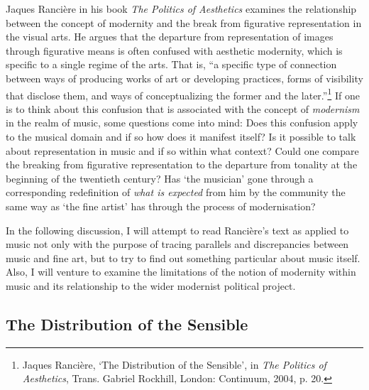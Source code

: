 Jaques Ranci\`{e}re in his book \emph{The Politics of Aesthetics} examines the relationship between the concept of modernity and the break from figurative representation in the visual arts. He argues that the departure from representation of images through figurative means is often confused with aesthetic modernity, which is specific to a single regime of the arts. That is, ``a specific type of connection between ways of producing works of art or developing practices, forms of visibility that disclose them, and ways of conceptualizing the former and the later.''\footnote{Jaques Ranci\`{e}re, `The Distribution of the Sensible', in \emph{The Politics of Aesthetics}, Trans. Gabriel Rockhill, London: Continuum, 2004, p. 20.} If one is to think about this confusion that is associated with the concept of \emph{modernism} in the realm of music, some questions come into mind: Does this confusion apply to the musical domain and if so how does it manifest itself? Is it possible to talk about representation in music and if so within what context? Could one compare the breaking from figurative representation to the departure from tonality at the beginning of the twentieth century? Has `the musician' gone through a corresponding redefinition of \emph{what is expected} from him by the community the same way as `the fine artist' has through the process of modernisation?

In the following discussion, I will attempt to read Ranci\`{e}re's text as applied to music not only with the purpose of tracing parallels and discrepancies between music and fine art, but to try to find out something particular about music itself. Also, I will venture to examine the limitations of the notion of modernity within music and its relationship to the wider modernist political project.

\subsection{The Distribution of the Sensible}

